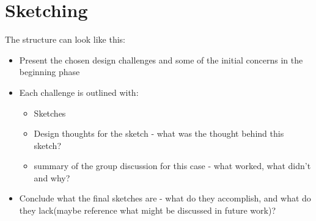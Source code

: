 \documentclass[11pt]{article}
\begin{document}

\clearpage\maketitle
\thispagestyle{empty}

\newpage



\section{Sketching}
The structure can look like this:
\begin{itemize}
	\item Present the chosen design challenges and some of the initial concerns in the beginning phase
	\item Each challenge is outlined with:
		\begin{itemize}
			\item Sketches
			\item Design thoughts for the sketch - what was the thought behind this sketch?
			\item summary of the group discussion for this case - what worked, what didn't and why?
		\end{itemize}
	\item Conclude what the final sketches are - what do they accomplish, and what do they lack(maybe reference what might be discussed in future work)?
\end{itemize}
\end{document}
